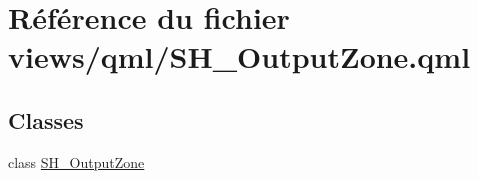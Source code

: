 \hypertarget{SH__OutputZone_8qml}{\section{Référence du fichier views/qml/\-S\-H\-\_\-\-Output\-Zone.qml}
\label{SH__OutputZone_8qml}
}
\subsection*{Classes}
\begin{DoxyCompactItemize}
\item 
class \hyperlink{classSH__OutputZone}{S\-H\-\_\-\-Output\-Zone}
\end{DoxyCompactItemize}
